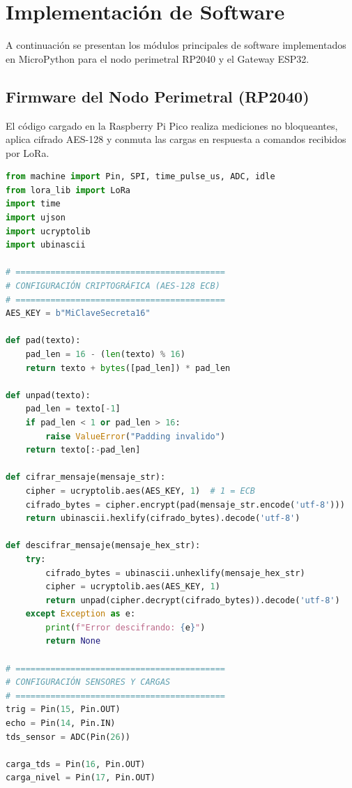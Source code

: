 \documentclass[12pt,letterpaper]{article}     %
\begin{document}
\section{Implementación de Software}
A continuación se presentan los módulos principales de software implementados en MicroPython para el nodo perimetral RP2040 y el Gateway ESP32.

\subsection{Firmware del Nodo Perimetral (RP2040)}
El código cargado en la Raspberry Pi Pico realiza mediciones no bloqueantes, aplica cifrado AES-128 y conmuta las cargas en respuesta a comandos recibidos por LoRa.

\begin{lstlisting}[language=Python,caption={Firmware completo del nodo sensor y actuador en RP2040 (\texttt{main.py})},label={lst:rp2040_py}]
from machine import Pin, SPI, time_pulse_us, ADC, idle
from lora_lib import LoRa
import time
import ujson
import ucryptolib
import ubinascii

# ==========================================
# CONFIGURACIÓN CRIPTOGRÁFICA (AES-128 ECB)
# ==========================================
AES_KEY = b"MiClaveSecreta16"

def pad(texto):
    pad_len = 16 - (len(texto) % 16)
    return texto + bytes([pad_len]) * pad_len

def unpad(texto):
    pad_len = texto[-1]
    if pad_len < 1 or pad_len > 16:
        raise ValueError("Padding invalido")
    return texto[:-pad_len]

def cifrar_mensaje(mensaje_str):
    cipher = ucryptolib.aes(AES_KEY, 1)  # 1 = ECB
    cifrado_bytes = cipher.encrypt(pad(mensaje_str.encode('utf-8')))
    return ubinascii.hexlify(cifrado_bytes).decode('utf-8')

def descifrar_mensaje(mensaje_hex_str):
    try:
        cifrado_bytes = ubinascii.unhexlify(mensaje_hex_str)
        cipher = ucryptolib.aes(AES_KEY, 1)
        return unpad(cipher.decrypt(cifrado_bytes)).decode('utf-8')
    except Exception as e:
        print(f"Error descifrando: {e}")
        return None

# ==========================================
# CONFIGURACIÓN SENSORES Y CARGAS
# ==========================================
trig = Pin(15, Pin.OUT)
echo = Pin(14, Pin.IN)
tds_sensor = ADC(Pin(26))

carga_tds = Pin(16, Pin.OUT)
carga_nivel = Pin(17, Pin.OUT)


\end{lstlisting}
\end{document}

